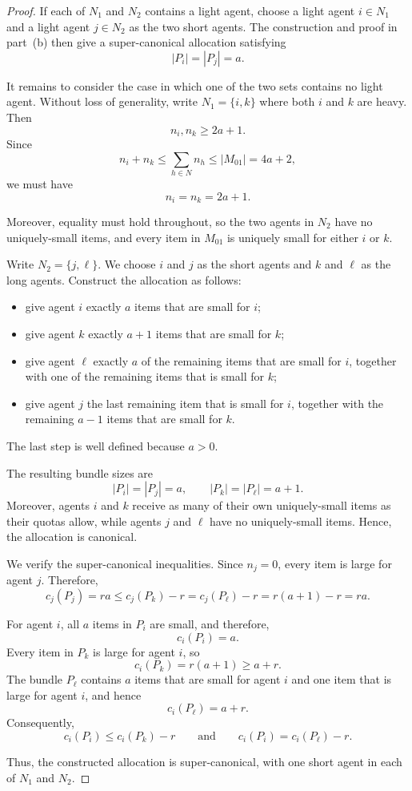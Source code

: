 \documentclass{article}
\theoremstyle{definition}
\begin{document}
\begin{proof}
If each of $N_1$ and $N_2$ contains a light agent, choose a light
agent $i\in N_1$ and a light agent $j\in N_2$ as the two short
agents.  The construction and proof in part~(b) then give a
super-canonical allocation satisfying
\[
    |P_i|=|P_j|=a.
\]

It remains to consider the case in which one of the two sets contains
no light agent.  Without loss of generality, write $N_1=\{i,k\}$ where both $i$ and $k$ are heavy.  Then
\[
    n_i,n_k\ge 2a+1.
\]
Since
\[
    n_i+n_k\le\sum_{h\in N}n_h
    \le |M_{01}|=4a+2,
\]
we must have
\[
    n_i=n_k=2a+1.
\]

Moreover, equality must hold throughout, so the two agents in
$N_2$ have no uniquely-small items, and every item in $M_{01}$ is
uniquely small for either $i$ or $k$.

Write $N_2=\{j,\ell\}$. We choose $i$ and $j$ as the short agents and $k$ and $\ell$ as the
long agents.  Construct the allocation as follows:
\begin{itemize}
    \item[1.] give agent $i$ exactly $a$ items that are small for $i$;
    \item[2.] give agent $k$ exactly $a+1$ items that are small for $k$;
    \item[3.] give agent $\ell$ exactly $a$ of the remaining items that
    are small for $i$, together with one of the remaining items that
    is small for $k$;
    \item[4.] give agent $j$ the last remaining item that is small for
    $i$, together with the remaining $a-1$ items that are small for
    $k$.
\end{itemize}
The last step is well defined because $a>0$.

The resulting bundle sizes are
\[
    |P_i|=|P_j|=a,
    \qquad
    |P_k|=|P_\ell|=a+1.
\]
Moreover, agents $i$ and $k$ receive as many of their own uniquely-small
items as their quotas allow, while agents $j$ and $\ell$ have no
uniquely-small items.  Hence, the allocation is canonical.

We verify the super-canonical inequalities.  Since $n_j=0$, every
item is large for agent $j$.  Therefore,
\[
    c_j(P_j)=ra \le c_j(P_k)-r=c_j(P_\ell)-r=r(a+1)-r = ra.
\]

For agent $i$, all $a$ items in $P_i$ are small, and therefore,
\[
    c_i(P_i)=a.
\]
Every item in $P_k$ is large for agent $i$, so
\[
    c_i(P_k)=r(a+1)\ge a+r.
\]
The bundle $P_\ell$ contains $a$ items that are small for agent $i$
and one item that is large for agent $i$, and hence
\[
    c_i(P_\ell)=a+r.
\]
Consequently,
\[
    c_i(P_i)\le c_i(P_k)-r
    \qquad\text{and}\qquad
    c_i(P_i)=c_i(P_\ell)-r.
\]

Thus, the constructed allocation is super-canonical, with one short
agent in each of $N_1$ and $N_2$.
\end{proof}
\end{document}
